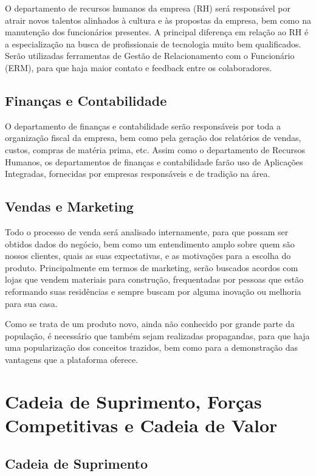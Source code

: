 O departamento de recursos humanos da empresa (RH) será responsável por atrair novos talentos alinhados à cultura e às propostas da empresa, bem como na manutenção dos funcionários presentes. A principal diferença em relação ao RH é a especialização na busca de profissionais de tecnologia muito bem qualificados. Serão utilizadas ferramentas de Gestão de Relacionamento com o Funcionário (ERM), para que haja maior contato e feedback entre os colaboradores.

\subsection{Finanças e Contabilidade}

O departamento de finanças e contabilidade serão responsáveis por toda a organização fiscal da empresa, bem como pela geração dos relatórios de vendas, custos, compras de matéria prima, etc. Assim como o departamento de Recursos Humanos, os departamentos de finanças e contabilidade farão uso de Aplicações Integradas, fornecidas por empresas responsáveis e de tradição na área.

\subsection{Vendas e Marketing}

Todo o processo de venda será analisado internamente, para que possam ser obtidos dados do negócio, bem como um entendimento amplo sobre quem são nossos clientes, quais as suas expectativas, e as motivações para a escolha do produto. Principalmente em termos de marketing, serão buscados acordos com lojas que vendem materiais para construção, frequentadas por pessoas que estão reformando suas residências e sempre buscam por alguma inovação ou melhoria para sua casa.

Como se trata de um produto novo, ainda não conhecido por grande parte da população, é necessário que também sejam realizadas propagandas, para que haja uma popularização dos conceitos trazidos, bem como para a demonstração das vantagens que a plataforma oferece.

\section{Cadeia de Suprimento, Forças Competitivas e Cadeia de Valor}

\subsection{Cadeia de Suprimento}

